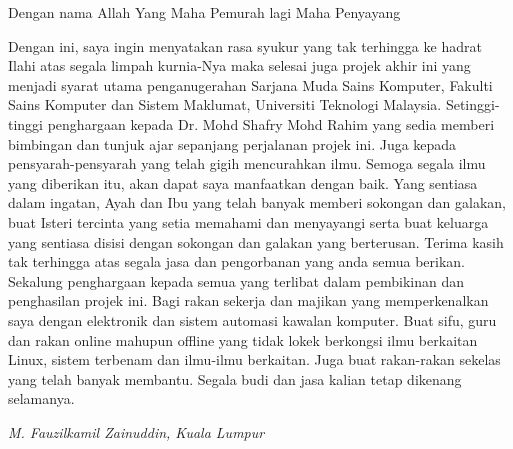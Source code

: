 \begin{acknowledgement}

Dengan nama Allah Yang Maha Pemurah lagi Maha Penyayang

Dengan ini, saya ingin menyatakan rasa syukur yang tak terhingga ke hadrat Ilahi atas segala limpah kurnia-Nya maka selesai juga projek akhir ini yang menjadi syarat utama penganugerahan Sarjana Muda Sains Komputer, Fakulti Sains Komputer dan Sistem Maklumat, Universiti Teknologi Malaysia.
Setinggi-tinggi penghargaan kepada Dr. Mohd Shafry Mohd Rahim yang sedia memberi bimbingan dan tunjuk ajar sepanjang perjalanan projek ini. Juga kepada pensyarah-pensyarah yang telah gigih mencurahkan ilmu. Semoga segala ilmu yang diberikan itu, akan dapat saya manfaatkan dengan baik.
Yang sentiasa dalam ingatan, Ayah dan Ibu yang telah banyak memberi sokongan dan galakan, buat Isteri tercinta yang setia memahami dan menyayangi serta buat keluarga yang sentiasa disisi dengan sokongan dan galakan yang berterusan. Terima kasih tak terhingga atas segala jasa dan pengorbanan yang anda semua berikan.
Sekalung penghargaan kepada semua yang terlibat dalam pembikinan dan penghasilan projek ini. Bagi rakan sekerja dan majikan yang memperkenalkan saya dengan elektronik dan sistem automasi kawalan komputer. Buat sifu, guru dan rakan online mahupun offline yang tidak lokek berkongsi ilmu berkaitan Linux, sistem terbenam dan ilmu-ilmu berkaitan. Juga buat rakan-rakan sekelas yang telah banyak membantu. Segala budi dan jasa kalian tetap dikenang selamanya.

\begin{flushright}
\textit{M. Fauzilkamil Zainuddin, Kuala Lumpur}
\end{flushright}
\end{acknowledgement}
